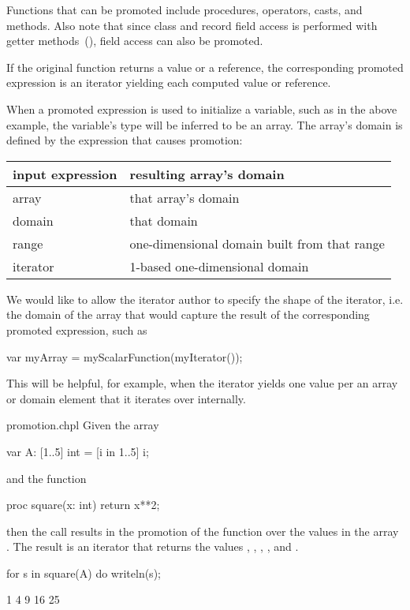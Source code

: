 Functions that can be promoted include procedures, operators, casts,
and methods. Also note that since class and record field access
is performed with getter methods~(), field
access can also be promoted.

If the original function returns a value or a reference, the
corresponding promoted expression is an iterator yielding each
computed value or reference.

When a promoted expression is used to initialize a variable,
such as  in the above example,
the variable's type will be inferred to be an array.
The array's domain is defined by the expression that causes promotion:

\begin{center}
\begin{tabular}[c]{|l|l|}
\hline
input expression & resulting array's domain \\
\hline
array    &  that array's domain \\
domain   &  that domain \\
range    &  one-dimensional domain built from that range \\
iterator &  1-based one-dimensional domain \\
\hline
\end{tabular}
\end{center}

\begin{future}
We would like to allow the iterator author to specify the shape
of the iterator, i.e. the domain of the array that would capture
the result of the corresponding promoted expression, such as
\begin{chapel}
var myArray = myScalarFunction(myIterator());
\end{chapel}
This will be helpful, for example, when the iterator yields
one value per an array or domain element that it iterates over
internally.
\end{future}

\begin{chapelexample}{promotion.chpl}
Given the array
\begin{chapel}
var A: [1..5] int = [i in 1..5] i;
\end{chapel}
and the function
\begin{chapel}
proc square(x: int) return x**2;
\end{chapel}
then the call  results in the promotion of
the  function over the values in the array .  The
result is an iterator that returns the
values , , , , and .
\begin{chapelnoprint}
for s in square(A) do writeln(s);
\end{chapelnoprint}
\begin{chapeloutput}
1
4
9
16
25
\end{chapeloutput}
\end{chapelexample}

